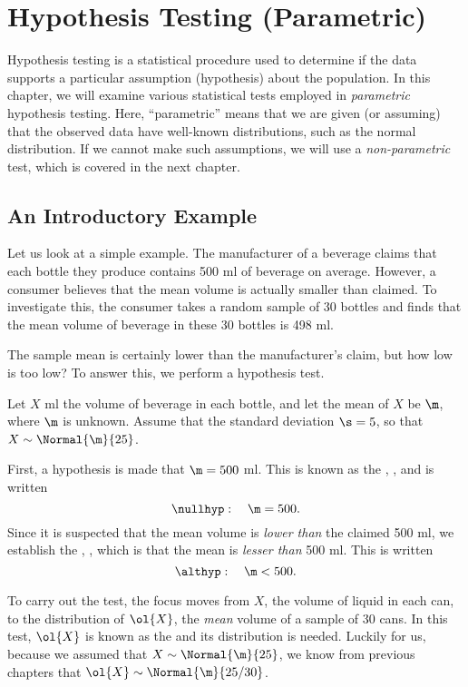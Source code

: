\chapter{Hypothesis Testing (Parametric)}

Hypothesis testing is a statistical procedure used to determine if the data supports a particular assumption (hypothesis) about the population. In this chapter, we will examine various statistical tests employed in \emph{parametric} hypothesis testing. Here, ``parametric'' means that we are given (or assuming) that the observed data have well-known distributions, such as the normal distribution. If we cannot make such assumptions, we will use a \emph{non-parametric} test, which is covered in the next chapter.

\section{An Introductory Example}

Let us look at a simple example. The manufacturer of a beverage claims that each bottle they produce contains 500 ml of beverage on average. However, a consumer believes that the mean volume is actually smaller than claimed. To investigate this, the consumer takes a random sample of 30 bottles and finds that the mean volume of beverage in these 30 bottles is 498 ml.

The sample mean is certainly lower than the manufacturer's claim, but how low is too low? To answer this, we perform a hypothesis test.

Let $X$ ml the volume of beverage in each bottle, and let the mean of $X$ be $\m$, where $\m$ is unknown. Assume that the standard deviation $\s = 5$, so that $X \sim \Normal{\m}{25}$.

First, a hypothesis is made that $\m = 500$ ml. This is known as the , \nullhyp, and is written \[\nullhyp: \quad \m = 500.\] Since it is suspected that the mean volume is \emph{lower than} the claimed 500 ml, we establish the , \althyp, which is that the mean is \emph{lesser than} 500 ml. This is written \[\althyp: \quad \m < 500.\]

To carry out the test, the focus moves from $X$, the volume of liquid in each can, to the distribution of $\ol{X}$, the \emph{mean} volume of a sample of 30 cans. In this test, $\ol{X}$ is known as the  and its distribution is needed. Luckily for us, because we assumed that $X \sim \Normal{\m}{25}$, we know from previous chapters that $\ol{X} \sim \Normal{\m}{25/30}$.

